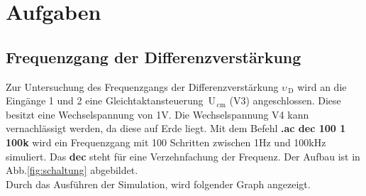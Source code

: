 \chapter{Aufgaben}
    \section{Frequenzgang der Differenzverstärkung}
Zur Untersuchung des Frequenzgangs der Differenzverstärkung $\upsilon_{\,\text{D}}$ wird an die Eingänge 1 und 2 eine Gleichtaktansteuerung $\,\text{U}_{\,\text{cm}}$ (V3) angeschlossen. Diese besitzt eine Wechselspannung von 1V. Die Wechselspannung V4 kann vernachlässigt werden, da diese auf Erde liegt. Mit dem Befehl \textbf{.ac dec 100 1 100k} wird ein Frequenzgang mit 100 Schritten zwischen 1Hz und 100kHz simuliert.
Das \textbf{dec} steht für eine Verzehnfachung der Frequenz. Der Aufbau ist in Abb.\ref{fig:schaltung} abgebildet.\\
Durch das Ausführen der Simulation, wird folgender Graph angezeigt.

